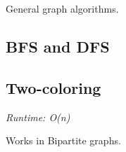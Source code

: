
General graph algorithms.

\subsection*{BFS and DFS}


\subsection*{Two-coloring}

\textit{Runtime: O(n)}

Works in Bipartite graphs.




\newpage